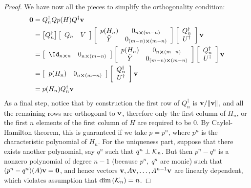 \begin{proof}
We have now all the pieces to simplify the orthogonality condition:
\begin{align*}
	\vectorbold{0} &= Q_n^{\dagger} Q p(H) Q^{\dagger}\vectorbold{v}\\
	&= \left[Q_n^{\dagger}\right] 
	\left[\begin{array}{cc}
		Q_n & V
	\end{array}\right]
	\left[\begin{array}{cc}
		p(H_n) & 0_{n\cross(m-n)}\\
		\tilde{Y} & 0_{(m-n)\cross(m-n)}
	\end{array}\right]
	\left[\begin{array}{cc}
		Q_n^{\dagger}\\
		U^{\dagger}
	\end{array}\right] \vectorbold{v}\\
	&= \left[\begin{array}{cc}
		\Id_{n\cross n} & 0_{n\cross(m-n)}
	\end{array}\right] 
	\left[\begin{array}{cc}
		p(H_n) & 0_{n\cross(m-n)}\\
		\tilde{Y} & 0_{(m-n)\cross(m-n)}
	\end{array}\right]
	\left[\begin{array}{cc}
		Q_n^{\dagger}\\
		U^{\dagger}
	\end{array}\right] \vectorbold{v}\\
	&= \left[\begin{array}{cc}
		p(H_n) & 0_{n\cross (m-n)} 
	\end{array}\right]
	\left[\begin{array}{cc}
		Q_n^{\dagger}\\
		U^{\dagger}
	\end{array}\right] \vectorbold{v}\\
	&= p(H_n)Q_n^{\dagger} \vectorbold{v}
\end{align*}
As a final step, notice that by construction the first row of \(Q_n^{\dagger}\) is
\(\vectorbold{v}/\norm{\vectorbold{v}}\), and all the remaining rows are orthogonal to \(\vectorbold{v}\),
therefore only the first column of \(H_n\), or the first \(n\) elements of the first column of \(H\) are required
to be \(0\). By Caylel-Hamilton theorem, this is guaranteed if we take \(p = p^n\), where \(p^n\) is the characteristic
polynomial of \(H_n\). For the uniqueness part, suppose that there exists another polynomial, say \(q^n\) such
that \(q^n \perp \mathcal{K}_{n}\). But then \(p^n - q^n\) is a nonzero polynomial of degree \(n-1\) (because \(p^n,\;q^n\) are
monic) such that \((p^n-q^n)(A)\vectorbold{v}=\vectorbold{0}\), and hence vectors \(\vectorbold{v},A\vectorbold{v},\ldots, A^{n-1}
\vectorbold{v}\) are linearly dependent, which violates assumption that \(\textrm{dim}\left(\mathcal{K}_{n}\right) = n\).
\end{proof}
